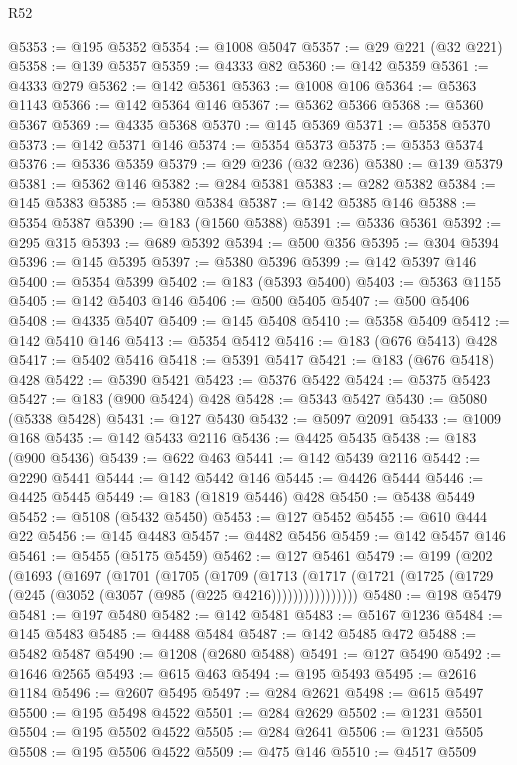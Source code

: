 \begin{lexlean}{R52}
\begin{coremodule}
@5353 := @195 @5352
@5354 := @1008 @5047
@5357 := @29 @221 (@32 @221)
@5358 := @139 @5357
@5359 := @4333 @82
@5360 := @142 @5359
@5361 := @4333 @279
@5362 := @142 @5361
@5363 := @1008 @106
@5364 := @5363 @1143
@5366 := @142 @5364 @146
@5367 := @5362 @5366
@5368 := @5360 @5367
@5369 := @4335 @5368
@5370 := @145 @5369
@5371 := @5358 @5370
@5373 := @142 @5371 @146
@5374 := @5354 @5373
@5375 := @5353 @5374
@5376 := @5336 @5359
@5379 := @29 @236 (@32 @236)
@5380 := @139 @5379
@5381 := @5362 @146
@5382 := @284 @5381
@5383 := @282 @5382
@5384 := @145 @5383
@5385 := @5380 @5384
@5387 := @142 @5385 @146
@5388 := @5354 @5387
@5390 := @183 (@1560 @5388)
@5391 := @5336 @5361
@5392 := @295 @315
@5393 := @689 @5392
@5394 := @500 @356
@5395 := @304 @5394
@5396 := @145 @5395
@5397 := @5380 @5396
@5399 := @142 @5397 @146
@5400 := @5354 @5399
@5402 := @183 (@5393 @5400)
@5403 := @5363 @1155
@5405 := @142 @5403 @146
@5406 := @500 @5405
@5407 := @500 @5406
@5408 := @4335 @5407
@5409 := @145 @5408
@5410 := @5358 @5409
@5412 := @142 @5410 @146
@5413 := @5354 @5412
@5416 := @183 (@676 @5413) @428
@5417 := @5402 @5416
@5418 := @5391 @5417
@5421 := @183 (@676 @5418) @428
@5422 := @5390 @5421
@5423 := @5376 @5422
@5424 := @5375 @5423
@5427 := @183 (@900 @5424) @428
@5428 := @5343 @5427
@5430 := @5080 (@5338 @5428)
@5431 := @127 @5430
@5432 := @5097 @2091
@5433 := @1009 @168
@5435 := @142 @5433 @2116
@5436 := @4425 @5435
@5438 := @183 (@900 @5436)
@5439 := @622 @463
@5441 := @142 @5439 @2116
@5442 := @2290 @5441
@5444 := @142 @5442 @146
@5445 := @4426 @5444
@5446 := @4425 @5445
@5449 := @183 (@1819 @5446) @428
@5450 := @5438 @5449
@5452 := @5108 (@5432 @5450)
@5453 := @127 @5452
@5455 := @610 @444 @22
@5456 := @145 @4483
@5457 := @4482 @5456
@5459 := @142 @5457 @146
@5461 := @5455 (@5175 @5459)
@5462 := @127 @5461
@5479 := @199
    (@202
      (@1693
        (@1697
          (@1701
            (@1705
              (@1709
                (@1713
                  (@1717 (@1721 (@1725 (@1729 (@245 (@3052 (@3057 (@985 (@225 @4216))))))))))))))))
@5480 := @198 @5479
@5481 := @197 @5480
@5482 := @142 @5481
@5483 := @5167 @1236
@5484 := @145 @5483
@5485 := @4488 @5484
@5487 := @142 @5485 @472
@5488 := @5482 @5487
@5490 := @1208 (@2680 @5488)
@5491 := @127 @5490
@5492 := @1646 @2565
@5493 := @615 @463
@5494 := @195 @5493
@5495 := @2616 @1184
@5496 := @2607 @5495
@5497 := @284 @2621
@5498 := @615 @5497
@5500 := @195 @5498 @4522
@5501 := @284 @2629
@5502 := @1231 @5501
@5504 := @195 @5502 @4522
@5505 := @284 @2641
@5506 := @1231 @5505
@5508 := @195 @5506 @4522
@5509 := @475 @146
@5510 := @4517 @5509

\end{coremodule}
\end{lexlean}
